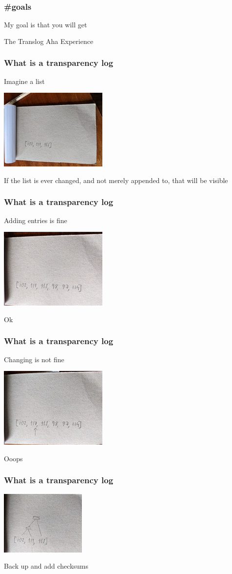 \begin{frame}
  \frametitle{\#goals}
  \centerline{My goal is that you will get}
  \centerline{The Translog Aha Experience}
\end{frame}

\begin{frame}
  \frametitle{What is a transparency log}
  \centerline{Imagine a list}
  \centerline{\includegraphics{img/list3_s}}
  \centerline{If the list is ever changed, and not merely appended to,
    that will be visible}
\end{frame}

\begin{frame}
  \frametitle{What is a transparency log}
  \centerline{Adding entries is fine}
  \centerline{\includegraphics{img/list6_s}}
  \centerline{Ok}
\end{frame}

\begin{frame}
  \frametitle{What is a transparency log}
  \centerline{Changing is not fine}
  \centerline{\includegraphics{img/list6mutarrow_s}}
  \centerline{Ooops}
\end{frame}

\begin{frame}
  \frametitle{What is a transparency log}
  \centerline{\includegraphics{img/tree3_s}}
  \centerline{Back up and add checksums}
\end{frame}

